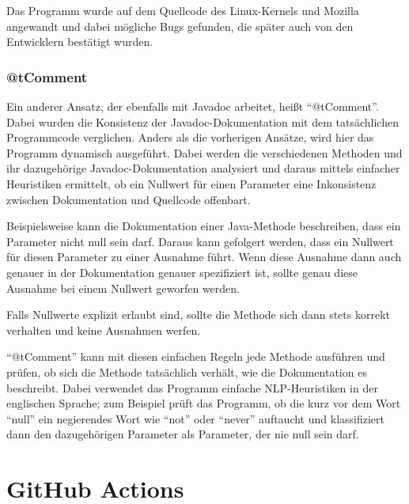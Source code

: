Das Programm wurde auf dem Quellcode des Linux-Kernels und Mozilla angewandt und dabei mögliche Bugs gefunden, die später auch von den Entwicklern bestätigt wurden\cite[S. 146.]{icomment}.
\subsubsection{@tComment}
Ein anderer Ansatz, der ebenfalls mit Javadoc arbeitet, heißt \enquote{@tComment}\cite[S. 1ff.]{@tComment:TestingJavadocCommentstoDetectComment-CodeInconsistencies}. Dabei wurden die Konsistenz der Javadoc-Dokumentation mit dem tatsächlichen Programmcode verglichen. Anders als die vorherigen Ansätze, wird hier das Programm dynamisch ausgeführt. Dabei werden die verschiedenen Methoden und ihr dazugehörige Javadoc-Dokumentation analysiert und daraus mittels einfacher Heuristiken ermittelt, ob ein  Nullwert für einen Parameter eine Inkonsistenz zwischen Dokumentation und Quellcode offenbart.

Beispielsweise kann die Dokumentation einer Java-Methode beschreiben, dass ein Parameter nicht null sein darf. Daraus kann gefolgert werden, dass ein Nullwert für diesen Parameter zu einer Ausnahme führt. Wenn diese Ausnahme dann auch genauer in der Dokumentation genauer spezifiziert ist, sollte genau diese Ausnahme bei einem Nullwert geworfen werden. 

Falls Nullwerte explizit erlaubt sind, sollte die Methode sich dann stets korrekt verhalten und keine Ausnahmen werfen. 

\enquote{@tComment} kann mit diesen einfachen Regeln jede Methode ausführen und prüfen, ob sich die Methode tatsächlich verhält, wie die Dokumentation es beschreibt. Dabei verwendet das Programm einfache \ac{NLP}-Heuristiken in der englischen Sprache; zum Beispiel prüft das Programm, ob die kurz vor dem Wort \enquote{null} ein negierendes Wort wie \enquote{not} oder \enquote{never} auftaucht und klassifiziert dann den dazugehörigen Parameter als Parameter, der nie null sein darf. 


\section{GitHub Actions}
